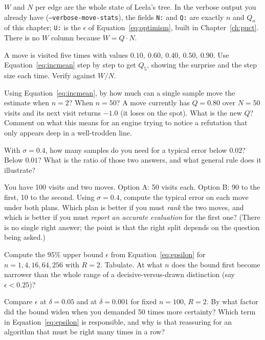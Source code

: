 \begin{repobox}[title={in this repository}]
$W$ and $N$ per edge are the whole state of Leela's tree. In the verbose output you already
have (\texttt{--verbose-move-stats}), the fields \texttt{N:} and \texttt{Q:} are exactly $n$
and $Q_n$ of this chapter; \texttt{U:} is the $\epsilon$ of Equation~\eqref{eq:optimism},
built in Chapter~\ref{ch:puct}. There is no $W$ column because $W = Q\cdot N$.
\end{repobox}

\begin{exercises}

 A move is visited five times with values
$0.10,\ 0.60,\ 0.40,\ 0.50,\ 0.90$. Use Equation~\eqref{eq:incmean} step by step to get
$Q_5$, showing the surprise and the step size each time. Verify against $W/N$.

 Using Equation~\eqref{eq:incmean}, by
how much can a single sample move the estimate when $n = 2$? When $n = 50$? A move currently
has $Q = 0.80$ over $N = 50$ visits and its next visit returns $-1.0$ (it loses on the spot).
What is the new $Q$? Comment on what this means for an engine trying to notice a refutation
that only appears deep in a well-trodden line.

 With $\sigma = 0.4$, how many samples do you need
for a typical error below $0.02$? Below $0.01$? What is the ratio of those two answers, and
what general rule does it illustrate?

 You have 100 visits and two moves. Option A: 50 visits
each. Option B: 90 to the first, 10 to the second. Using $\sigma = 0.4$, compute the typical
error on each move under both plans. Which plan is better if you must \emph{rank} the two
moves, and which is better if you must \emph{report an accurate evaluation} for the first
one? (There is no single right answer; the point is that the right split depends on the
question being asked.)

 Compute the $95\%$ upper bound $\epsilon$ from
Equation~\eqref{eq:epsilon} for $n = 1, 4, 16, 64, 256$ with $R = 2$. Tabulate. At what $n$
does the bound first become narrower than the whole range of a decisive-versus-drawn
distinction (say $\epsilon < 0.25$)?

 Compare $\epsilon$ at $\delta = 0.05$ and at
$\delta = 0.001$ for fixed $n = 100$, $R = 2$. By what factor did the bound widen when you
demanded 50 times more certainty? Which term in Equation~\eqref{eq:epsilon} is responsible,
and why is that reassuring for an algorithm that must be right many times in a row?


\end{exercises}
